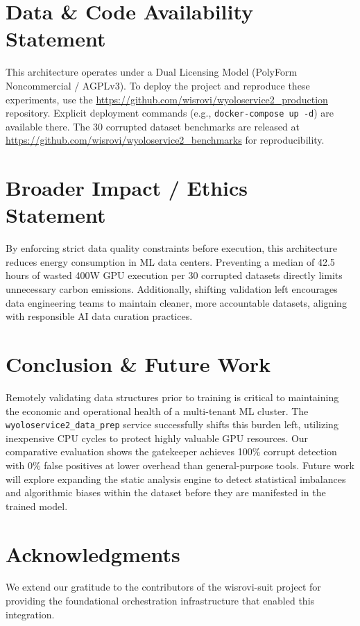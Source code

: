 \documentclass[10pt,twocolumn,letterpaper]{article}
\begin{document}
\section{Data \& Code Availability Statement}
This architecture operates under a Dual Licensing Model (PolyForm Noncommercial / AGPLv3). To deploy the project and reproduce these experiments, use the \url{https://github.com/wisrovi/wyoloservice2_production} repository. Explicit deployment commands (e.g., \texttt{docker-compose up -d}) are available there. The 30 corrupted dataset benchmarks are released at \url{https://github.com/wisrovi/wyoloservice2_benchmarks} for reproducibility.

\section{Broader Impact / Ethics Statement}
By enforcing strict data quality constraints before execution, this architecture reduces energy consumption in ML data centers. Preventing a median of 42.5 hours of wasted 400W GPU execution per 30 corrupted datasets directly limits unnecessary carbon emissions. Additionally, shifting validation left encourages data engineering teams to maintain cleaner, more accountable datasets, aligning with responsible AI data curation practices.

\section{Conclusion \& Future Work}
Remotely validating data structures prior to training is critical to maintaining the economic and operational health of a multi-tenant ML cluster. The \texttt{wyoloservice2\_data\_prep} service successfully shifts this burden left, utilizing inexpensive CPU cycles to protect highly valuable GPU resources. Our comparative evaluation shows the gatekeeper achieves 100\% corrupt detection with 0\% false positives at lower overhead than general-purpose tools. Future work will explore expanding the static analysis engine to detect statistical imbalances and algorithmic biases within the dataset before they are manifested in the trained model.

\section{Acknowledgments}
We extend our gratitude to the contributors of the wisrovi-suit project for providing the foundational orchestration infrastructure that enabled this integration.



\end{document}
